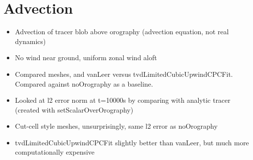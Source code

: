 \section{Advection}
\begin{itemize}
\item Advection of tracer blob above orography (advection equation, not real dynamics)
\item No wind near ground, uniform zonal wind aloft
\item Compared meshes, and vanLeer versus tvdLimitedCubicUpwindCPCFit.  Compared against noOrography as a baseline.
\item Looked at l2 error norm at t=10000s by comparing with analytic tracer (created with setScalarOverOrography)
\item Cut-cell style meshes, unsurprisingly, same l2 error as noOrography
\item tvdLimitedCubicUpwindCPCFit slightly better than vanLeer, but much more computationally expensive
\end{itemize}

